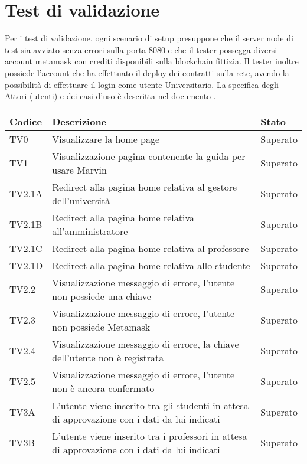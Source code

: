 \documentclass[PianoDiQualifica.tex]{subfiles}
\begin{document}
\chapter{Test di validazione}

Per i test di validazione, ogni scenario di setup presuppone che il server node di test sia avviato senza errori sulla porta 8080 e che il tester possegga diversi account metamask con crediti disponibili sulla blockchain fittizia.
Il tester inoltre possiede l’account che ha effettuato il deploy dei contratti sulla rete, avendo la possibilità di effettuare il login come utente Universitario.
La specifica degli Attori (utenti) e dei casi d’uso è descritta nel documento \adr \vrquattro.

\begin{longtable}[H]{P{2cm}P{8.5cm}P{3cm}}
	\color{CHeaderText}\textbf{Codice} & 
	\color{CHeaderText}\textbf{Descrizione} & 
	\color{CHeaderText}\textbf{Stato}\\
	\endhead
	TV0 & Visualizzare la home page & Superato \\
	TV1 & Visualizzazione pagina contenente la guida per usare Marvin & Superato \\
	TV2.1A & Redirect alla pagina home relativa al gestore dell'università & Superato \\
	TV2.1B & Redirect alla pagina home relativa all'amministratore & Superato \\
	TV2.1C & Redirect alla pagina home relativa al professore & Superato \\
	TV2.1D & Redirect alla pagina home relativa allo studente & Superato \\
	TV2.2 & Visualizzazione messaggio di errore, l'utente non possiede una chiave & Superato \\ 
	TV2.3 & Visualizzazione messaggio di errore, l'utente non possiede Metamask & Superato \\ 
	TV2.4 & Visualizzazione messaggio di errore, la chiave dell'utente non è registrata & Superato \\ 
	TV2.5 & Visualizzazione messaggio di errore, l'utente non è ancora confermato & Superato \\ 
	TV3A & L'utente viene inserito tra gli studenti in attesa di approvazione con i dati da lui indicati & Superato \\ 
	TV3B & L'utente viene inserito tra i professori in attesa di approvazione con i dati da lui indicati & Superato \\ 

\end{longtable}
\end{document}
